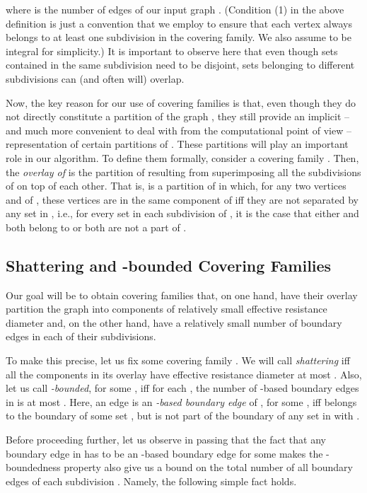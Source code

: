 \documentclass[11pt, letterpaper]{article}
\begin{document}
where  is the number of edges of our input graph . (Condition (1) in the above definition is just a convention that we employ to ensure that each vertex always belongs to at least one subdivision in the covering family. We also assume  to be integral for simplicity.) It is important to observe here that even though sets contained in the same subdivision  need to be disjoint, sets belonging to different subdivisions can (and often will) overlap.

Now, the key reason for our use of covering families is that, even though they do not directly constitute a partition of the graph , they still provide an implicit -- and much more convenient to deal with from the computational point of view -- representation of certain partitions of . These partitions will play an important role in our algorithm. To define them formally, consider a covering family . Then, the {\em overlay  of } is the partition of  resulting from superimposing all the subdivisions  of  on top of each other. That is,  is a partition of  in which, for any two vertices  and  of , these vertices are in the same component of  iff they are not separated by any set in , i.e., for every set  in each subdivision  of , it is the case that either  and  both belong to  or both are not a part of .



\subsection{Shattering and -bounded Covering Families}\label{sec:shattering_alpha_bounded_families}

Our goal will be to obtain covering families  that, on one hand, have their overlay  partition the graph  into components of relatively small effective resistance diameter and, on the other hand, have a relatively small number of boundary edges in each of their subdivisions.

To make this precise, let us fix some covering family . We will call  {\em shattering} iff all the components in its overlay  have effective resistance diameter at most . Also, let us call  {\em -bounded}, for some , iff for each , the number of -based boundary edges in  is at most . Here, an edge  is an {\em -based boundary edge} of , for some , iff  belongs to the boundary  of some set , but is not part of the boundary of any set  in  with .

Before proceeding further, let us observe in passing that the fact that any boundary edge in  has to be an -based boundary edge for some  makes the -boundedness property also give us a bound on the total number of all boundary edges of each subdivision . Namely, the following simple fact holds.
\end{document}
